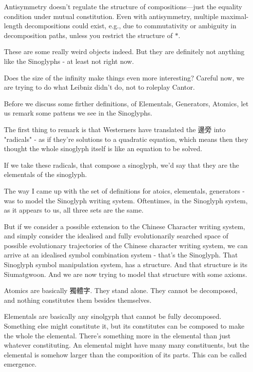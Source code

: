 Antisymmetry doesn't regulate the structure of compositions—just the equality condition under mutual constitution. Even with antisymmetry, multiple maximal-length decompositions could exist, e.g., due to commutativity or ambiguity in decomposition paths, unless you restrict the structure of $*$.



These are some really weird objects indeed. But they are definitely not anything like the Sinoglyphs - at least not right now. 




Does the size of the infinity make things even more interesting? Careful now, we are trying to do what Leibniz didn't do, not to roleplay Cantor. 

Before we discuss some firther definitions, of Elementals, Generators, Atomics, let us remark some pattens we see in the Sinoglyphs. 

The first thing to remark is that Westerners have translated the 邊旁 into "radicals" - as if they're solutions to a quadratic equation, which means then they thought the whole sinoglyph itself is like an equation to be solved. 

If we take these radicals, that compose a sinoglyph, we'd say that they are the elementals of the sinoglyph. 

The way I came up with the set of definitions for atoics, elementals, generators - was to model the Sinoglyph writing system. Oftentimes, in the Sinoglyph system, as it appears to us, all three sets are the same. 

But if we consider a possible extension to the Chinese Character writing system, and simply consider the idealised and fully evolutionarily searched space of possible evolutionary trajectories of the Chinese character writing system, we can arrive at an idealised symbol combination system - that's the Sinoglyph. That Sinoglyph symbol manipulation system, has a structure. And that structure is its Siumatgwoon. And we are now trying to model that structure with some axioms. 

Atomics are basically 獨體字. They stand alone. They cannot be decomposed, and nothing constitutes them besides themselves.

Elementals are basically any sinolgyph that cannot be fully decomposed. Something else might constitute it, but its constitutes can be composed to make the whole the elemental. There's something more in the elemental than just whatever constituting. An elemental might have many many constituents, but the elemental is somehow larger than the composition of its parts. This can be called emergence. 

